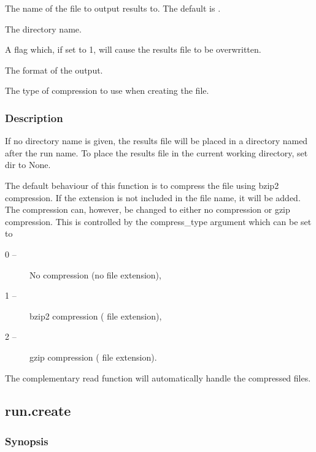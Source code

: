   The name of the file to output results to.  The default is . 

  The directory name. 

  A flag which, if set to 1, will cause the results file to be overwritten. 

  The format of the output. 

  The type of compression to use when creating the file. 




\subsubsection{Description}

If no directory name is given, the results file will be placed in a directory named after the run name.  To place the results file in the current working directory, set dir to None.


The default behaviour of this function is to compress the file using bzip2 compression.  If the extension  is not included in the file name, it will be added.  The compression can, however, be changed to either no compression or gzip compression.  This is controlled by the compress\_type argument which can be set to


\begin{description}
\item[0 --]  No compression (no file extension), 
\item[1 --]  bzip2 compression ( file extension), 
\item[2 --]  gzip compression ( file extension). 
\end{description}


The complementary read function will automatically handle the compressed files.




\newpage

\subsection{run.create}


\subsubsection{Synopsis}

